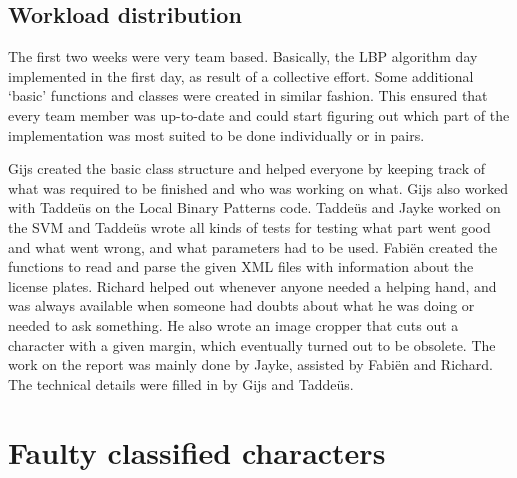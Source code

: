 \documentclass[a4paper]{article}
\begin{document}
\subsection{Workload distribution}

The first two weeks were very team based. Basically, the LBP algorithm day
implemented in the first day, as result of a collective effort. Some
additional `basic' functions and classes were created in similar fashion. This
ensured that every team member was up-to-date and could start figuring out
which part of the implementation was most suited to be done individually or in
pairs.

Gijs created the basic class structure and helped everyone by keeping track of
what was required to be finished and who was working on what. Gijs also
worked with Tadde\"us on the Local Binary Patterns code.  Tadde\"us and Jayke
worked on the SVM and Tadde\"us wrote all kinds of tests for testing what part
went good and what went wrong, and what parameters had to be used. Fabi\"en
created the functions to read and parse the given XML files with information
about the license plates. Richard helped out whenever anyone needed a helping
hand, and was always available when someone had doubts about what he was doing
or needed to ask something. He also wrote an image cropper that cuts out a
character with a given margin, which eventually turned out to be obsolete. The
work on the report was mainly done by Jayke, assisted by Fabi\"en and Richard.
The technical details were filled in by Gijs and Tadde\"us.

\appendix

\section{Faulty classified characters}
\label{fcc}
\end{document}
